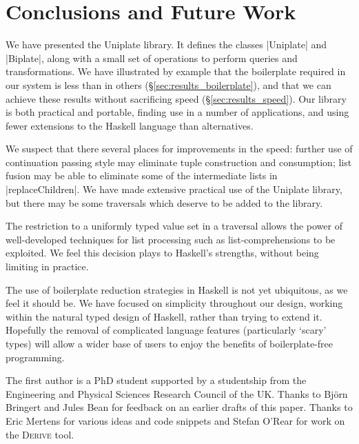 \documentclass[preprint]{sigplanconf}
\newcommand{\derive}{\textsc{Derive}}
\begin{document}
\section{Conclusions and Future Work}
\label{sec:conclusion}

We have presented the Uniplate library. It defines the classes |Uniplate| and |Biplate|, along with a small set of operations to perform queries and transformations. We have illustrated by example that the boilerplate required in our system is less than in others (\S\ref{sec:results_boilerplate}), and that we can achieve these results without sacrificing speed (\S\ref{sec:results_speed}). Our library is both practical and portable, finding use in a number of applications, and using fewer extensions to the Haskell language than alternatives.

We suspect that there several places for improvements in the speed: further use of continuation passing style may eliminate tuple construction and consumption; list fusion may be able to eliminate some of the intermediate lists in |replaceChildren|. We have made extensive practical use of the Uniplate library, but there may be some traversals which deserve to be added to the library.

The restriction to a uniformly typed value set in a traversal allows the power of well-developed techniques for list processing such as list-comprehensions to be exploited. We feel this decision plays to Haskell's strengths, without being limiting in practice.

The use of boilerplate reduction strategies in Haskell is not yet ubiquitous, as we feel it should be. We have focused on simplicity throughout our design, working within the natural typed design of Haskell, rather than trying to extend it. Hopefully the removal of complicated language features (particularly `scary' types) will allow a wider base of users to enjoy the benefits of boilerplate-free programming.


\acks

The first author is a PhD student supported by a studentship from the Engineering and Physical Sciences Research Council of the UK. Thanks to Bj\"{o}rn Bringert and Jules Bean for feedback on an earlier drafts of this paper. Thanks to Eric Mertens for various ideas and code snippets and Stefan O'Rear for work on the \derive{} tool.



\end{document}
